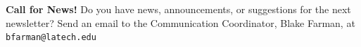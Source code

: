 \documentclass[10pt]{article} %
\begin{document}
\begin{minipage}[t]{.30\linewidth}
\begin{mdframed}[style=sidebar,frametitle={}]
    \textbf{Call for News!}
    Do you have news, announcements, or suggestions for the next newsletter?
    Send an email to the Communication Coordinator, Blake Farman, at \texttt{\mbox{bfarman@latech.edu}}

  \end{mdframed}
\end{minipage}\hfill %
\end{document}
